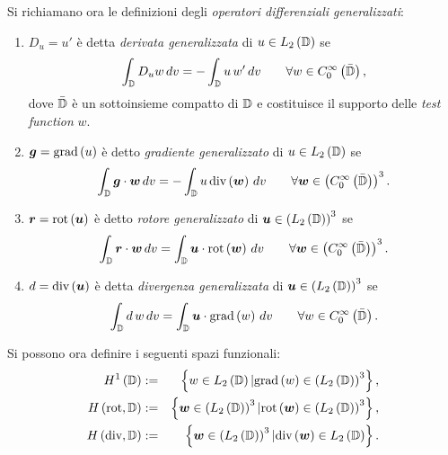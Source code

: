 Si richiamano ora le definizioni degli \textit{operatori differenziali generalizzati}:
\begin{enumerate}


\item $D_u = u'$ è detta \textit{derivata generalizzata} di $u \in L_2\left(\mathbb{D}\right)$ se 
\begin{equation}
\label{eq:3gen_der}
\int_{\mathbb{D}}D_u w\, dv = - \int_{\mathbb{D}}u \,w' \, dv \qquad \forall w \in C_0^\infty\left(\bar{\mathbb{D}}\right),
\end{equation}
dove $\bar{\mathbb{D}}$ è un sottoinsieme compatto di $\mathbb{D}$ e costituisce il supporto delle \textit{test function} $w$. 
\item $\boldsymbol{g}=\text{grad}\left(u\right)$ è detto \textit{gradiente generalizzato} di $u \in  L_2\left(\mathbb{D}\right)$ se
\begin{equation}
\label{eq:3gen_grad}
\int_{\mathbb{D}}\boldsymbol{g}\cdot \boldsymbol{w}\, dv = - \int_{\mathbb{D}}u \,\text{div}\left(\boldsymbol{w}\right) \, dv \qquad \forall \boldsymbol{w} \in \left(C_0^\infty\left(\bar{\mathbb{D}}\right)\right)^3.
\end{equation}
\item $\boldsymbol{r}=\text{rot}\left(\boldsymbol{u}\right)$ è detto \textit{rotore generalizzato} di $\boldsymbol{u} \in  \left(L_2\left(\mathbb{D}\right)\right)^3$ se
\begin{equation}
\label{eq:3gen_rot}
\int_{\mathbb{D}}\boldsymbol{r}\cdot \boldsymbol{w}\, dv =  \int_{\mathbb{D}}\boldsymbol{u}\cdot \text{rot}\left(\boldsymbol{w}\right) \, dv \qquad \forall \boldsymbol{w} \in \left(C_0^\infty\left(\bar{\mathbb{D}}\right)\right)^3.
\end{equation}
\item $d = \text{div}\left(\boldsymbol{u}\right)$ è detta \textit{divergenza generalizzata} di $\boldsymbol{u} \in  \left(L_2\left(\mathbb{D}\right)\right)^3$ se
\begin{equation}
\label{eq:3gen_div}
\int_{\mathbb{D}}d\, w\, dv =  \int_{\mathbb{D}}\boldsymbol{u}\cdot \text{grad}\left(w\right) \, dv \qquad \forall w \in C_0^\infty\left(\bar{\mathbb{D}}\right).
\end{equation}
\end{enumerate}

Si possono ora definire i seguenti spazi funzionali:
\begin{eqnarray}
\label{eq:3h1}
H^1\left(\mathbb{D}\right) &:=&\left\{ w \in L_2\left(\mathbb{D}\right) | \text{grad}\left( w\right) \in \left(L_2\left(\mathbb{D}\right)\right)^3\right\},\\
\label{eq:3hcurl}
H\left(\text{rot},\mathbb{D}\right) &:=&\left\{ \boldsymbol{w} \in \left(L_2\left(\mathbb{D}\right)\right)^3 | \text{rot}\left( \boldsymbol{w}\right) \in \left(L_2\left(\mathbb{D}\right)\right)^3\right\},\\
\label{eq:3hdiv}
H\left(\text{div},\mathbb{D}\right) &:=&\left\{ \boldsymbol{w} \in \left(L_2\left(\mathbb{D}\right)\right)^3 | \text{div}\left( \boldsymbol{w}\right) \in L_2\left(\mathbb{D}\right)\right\}.
\end{eqnarray}

